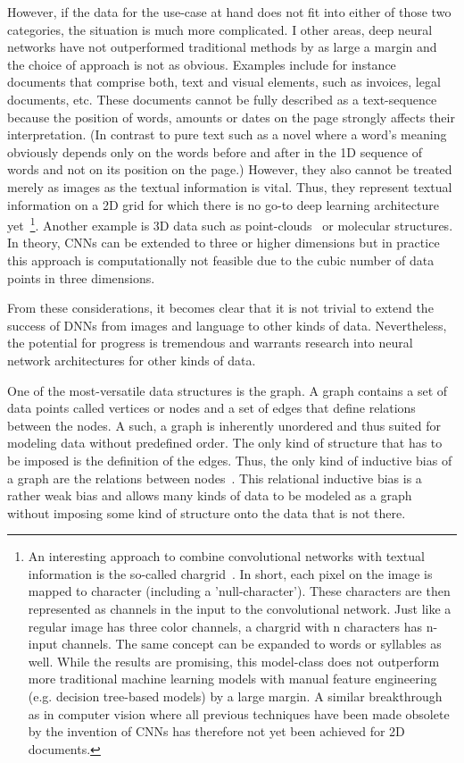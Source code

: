 However, if the data for the use-case at hand does not fit into either of those two categories, the situation is much more complicated. I other areas, deep neural networks have not outperformed traditional methods by as large a margin and the choice of approach is not as obvious. Examples include for instance documents that comprise both, text and visual elements, such as invoices, legal documents, etc. These documents cannot be fully described as a text-sequence because the position of words, amounts or dates on the page strongly affects their interpretation. (In contrast to pure text such as a novel where a word's meaning obviously depends only on the words before and after in the 1D sequence of words and not on its position on the page.) However, they also cannot be treated merely as images as the textual information is vital. Thus, they represent textual information on a 2D grid for which there is no go-to deep learning architecture yet~\footnote{
	An interesting approach to combine convolutional networks with textual information is the so-called chargrid~\cite{Katti2020}. In short, each pixel on the image is mapped to character (including a 'null-character'). These characters are then represented as channels in the input to the convolutional network. Just like a regular image has three color channels, a chargrid with n characters has n-input channels. The same concept can be expanded to words or syllables as well. While the results are promising, this model-class does not outperform more traditional machine learning models with manual feature engineering (e.g. decision tree-based models) by a large margin. A similar breakthrough as in computer vision where all previous techniques have been made obsolete by the invention of CNNs has therefore not yet been achieved for 2D documents.
}. Another example is 3D data such as point-clouds~\cite{Charles2017} or molecular structures. In theory, CNNs can be extended to three or higher dimensions but in practice this approach is computationally not feasible due to the cubic number of data points in three dimensions.

From these considerations, it becomes clear that it is not trivial to extend the success of DNNs from images and language to other kinds of data. Nevertheless, the potential for progress is tremendous and warrants research into neural network architectures for other kinds of data.

One of the most-versatile data structures is the graph. A graph contains a set of data points called vertices or nodes and a set of edges that define relations between the nodes. A such, a graph is inherently unordered and thus suited for modeling data without predefined order. The only kind of structure that has to be imposed is the definition of the edges. Thus, the only kind of inductive bias of a graph are the relations between nodes~\cite{Battaglia2018}. This relational inductive bias is a rather weak bias and allows many kinds of data to be modeled as a graph without imposing some kind of structure onto the data that is not there.

